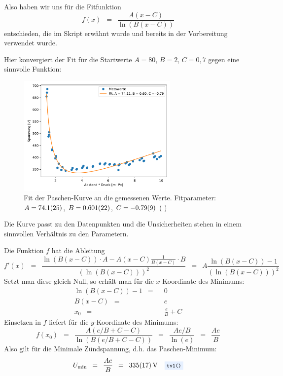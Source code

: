 \documentclass{article}
\newcommand{\widespace}{\enspace}
\newcommand{\wideeq}{\widespace = \widespace}
\newcommand{\coderef}[1]{%
    \text{\footnotesize \colorbox{codebg}{\texttt{#1()}}}%
}
\begin{document}
Also haben wir uns für die Fitfunktion
\[
    f(x) \wideeq \frac{A (x - C)}{\ln(B (x - C))}
\]
entschieden, die im Skript erwähnt wurde und bereits in der Vorbereitung
verwendet wurde.

Hier konvergiert der Fit für die Startwerte $A = 80$, $B = 2$, $C = 0,7$
gegen eine sinnvolle Funktion:
\begin{figure}[H]
    \centering
    \includegraphics[width=0.7\textwidth]{Abbildungen/Graph_TV1_3.pdf}
    \caption{Fit der Paschen-Kurve an die gemessenen Werte.
    Fitparameter: $A = \num{74.1 \pm 2.5}$,
    $B = \num{0.601 \pm 0.022}$, $C = \num{-0.79 \pm 0.09}$
    (\coderef{tv1})}
    \label{graph_tv1}
\end{figure}
Die Kurve passt zu den Datenpunkten und die Unsicherheiten stehen in einem sinnvollen
Verhältnis zu den Parametern.

Die Funktion $f$ hat die Ableitung
\[
    f'(x) \wideeq \frac{
        \ln(B (x - C)) \cdot A - A (x - C) \frac{1}{B (x - C)} \cdot B
    }{
        \left( \ln(B (x - C)) \right)^2
    }
    \wideeq A \frac{\ln(B (x - C)) - 1}{
        \left( \ln(B (x - C)) \right)^2
    }
\]
Setzt man diese gleich Null, so erhält man für die $x$-Koordinate des Minimums:
\begin{align*}
    \ln(B (x - C)) - 1 \wideeq& 0 \\
    B (x - C) \wideeq& e \\
    x_0 \wideeq& \frac e B + C
\end{align*}
Einsetzen in $f$ liefert für die $y$-Koordinate des Minimums:
\[
    f(x_0) \wideeq \frac{A (e / B + C - C)}{\ln( B (e / B + C - C))}
    \wideeq \frac{A e / B}{\ln(e)} \wideeq \frac{A e}{B}
\]
Also gilt für die Minimale Zündspannung, d.h. das Paschen-Minimum:
\[
    U_\text{min} \wideeq \frac{A e}{B} \wideeq \qty{335 \pm 17}{\volt}
    \quad \coderef{tv1}
\]
\end{document}
